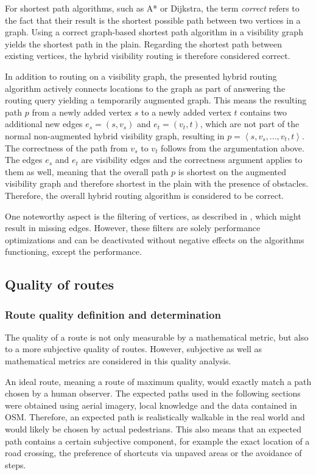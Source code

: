 		For shortest path algorithms, such as A* or Dijkstra, the term \emph{correct} refers to the fact that their result is the shortest possible path between two vertices in a graph.
		Using a correct graph-based shortest path algorithm in a visibility graph yields the shortest path in the plain.
		Regarding the shortest path between existing vertices, the hybrid visibility routing is therefore considered correct.
		
		In addition to routing on a visibility graph, the presented hybrid routing algorithm actively connects locations to the graph as part of answering the routing query yielding a temporarily augmented graph.
		This means the resulting path $p$ from a newly added vertex $s$ to a newly added vertex $t$ contains two additional new edges $e_s=(s, v_s)$ and $e_t=(v_t, t)$, which are not part of the normal non-augmented hybrid visibility graph, resulting in $p=\left\langle s, v_s, ..., v_t, t \right\rangle$.
		The correctness of the path from $v_s$ to $v_t$ follows from the argumentation above.
		The edges $e_s$ and $e_t$ are visibility edges and the correctness argument applies to them as well, meaning that the overall path $p$ is shortest on the augmented visibility graph and therefore shortest in the plain with the presence of obstacles.
		Therefore, the overall hybrid routing algorithm is considered to be correct.
		
		One noteworthy aspect is the filtering of vertices, as described in , which might result in missing edges.
		However, these filters are solely performance optimizations and can be deactivated without negative effects on the algorithms functioning, except the performance.
		
	\subsection{Quality of routes}
	
		\subsubsection{Route quality definition and determination}
	
			The quality of a route is not only measurable by a mathematical metric, but also to a more subjective quality of routes.
			However, subjective as well as mathematical metrics are considered in this quality analysis.
			
			An ideal route, meaning a route of maximum quality, would exactly match a path chosen by a human observer.
			The expected paths used in the following sections were obtained using aerial imagery, local knowledge and the data contained in OSM.
			Therefore, an expected path is realistically walkable in the real world and would likely be chosen by actual pedestrians.
			This also means that an expected path contains a certain subjective component, for example the exact location of a road crossing, the preference of shortcuts via unpaved areas or the avoidance of steps.
	
